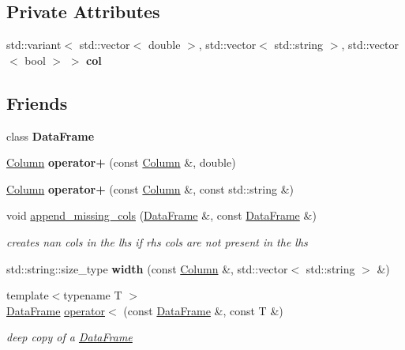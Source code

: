\subsection*{Private Attributes}
\begin{DoxyCompactItemize}
\item 
\mbox{\label{classColumn_afc2ec33bb14a25834cc0d4a272fe0a9d}} 
std\+::variant$<$ std\+::vector$<$ double $>$, std\+::vector$<$ std\+::string $>$, std\+::vector$<$ bool $>$ $>$ {\bfseries col}
\end{DoxyCompactItemize}
\subsection*{Friends}
\begin{DoxyCompactItemize}
\item 
\mbox{\label{classColumn_ac3cf826bc43b8ab4740915b5c60e7166}} 
class {\bfseries Data\+Frame}
\item 
\mbox{\label{classColumn_a0073d63e1317b7b2bad1c4daa275b0ba}} 
\hyperlink{classColumn}{Column} {\bfseries operator+} (const \hyperlink{classColumn}{Column} \&, double)
\item 
\mbox{\label{classColumn_a07ec03095bd9fec0ccdccafcadef8ea2}} 
\hyperlink{classColumn}{Column} {\bfseries operator+} (const \hyperlink{classColumn}{Column} \&, const std\+::string \&)
\item 
void \hyperlink{classColumn_a27cc8acd51a5cd40e6a2726368914661}{append\+\_\+missing\+\_\+cols} (\hyperlink{classDataFrame}{Data\+Frame} \&, const \hyperlink{classDataFrame}{Data\+Frame} \&)
\begin{DoxyCompactList}\small\item\em creates nan cols in the lhs if rhs cols are not present in the lhs \end{DoxyCompactList}\item 
\mbox{\label{classColumn_acbe8416c515df226506ae71d8c6fd05a}} 
std\+::string\+::size\+\_\+type {\bfseries width} (const \hyperlink{classColumn}{Column} \&, std\+::vector$<$ std\+::string $>$ \&)
\item 
{\footnotesize template$<$typename T $>$ }\\\hyperlink{classDataFrame}{Data\+Frame} \hyperlink{classColumn_a92ccb0425c54a5b5cd6f78ed1bb4c3ff}{operator$<$} (const \hyperlink{classDataFrame}{Data\+Frame} \&, const T \&)
\begin{DoxyCompactList}\small\item\em deep copy of a \hyperlink{classDataFrame}{Data\+Frame} \end{DoxyCompactList}\end{DoxyCompactItemize}


